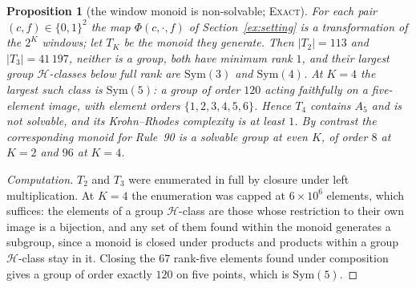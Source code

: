 \documentclass[11pt]{article}
\newtheorem{proposition}[theorem]{Proposition}
\theoremstyle{definition}
\theoremstyle{remark}
\newcommand{\EXACT}{\textsc{Exact}}
\begin{document}
\begin{proposition}[the window monoid is non-solvable; \EXACT]\label{p3:monoid}
For each pair $(c,f)\in\{0,1\}^2$ the map $\Phi(c,\cdot,f)$ of Section~\ref{ex:setting} is a
transformation of the $2^{K}$ windows; let $T_K$ be the monoid they generate. Then $|T_2|=113$ and
$|T_3|=41\,197$, neither is a group, both have minimum rank $1$, and their largest group
$\mathcal H$-classes below full rank are $\mathrm{Sym}(3)$ and $\mathrm{Sym}(4)$. At $K=4$ the largest
such class is $\mathrm{Sym}(5)$: a group of order $120$ acting faithfully on a five-element image, with
element orders $\{1,2,3,4,5,6\}$. Hence $T_4$ contains $A_5$ and is \emph{not solvable}, and its
Krohn--Rhodes complexity is at least $1$. By contrast the corresponding monoid for Rule~90 is a solvable
\emph{group} at even $K$, of order $8$ at $K=2$ and $96$ at $K=4$.
\end{proposition}
\begin{proof}[Computation]
$T_2$ and $T_3$ were enumerated in full by closure under left multiplication. At $K=4$ the enumeration
was capped at $6\times10^{6}$ elements, which suffices: the elements of a group $\mathcal H$-class are
those whose restriction to their own image is a bijection, and any set of them found within the monoid
generates a subgroup, since a monoid is closed under products and products within a group
$\mathcal H$-class stay in it. Closing the $67$ rank-five elements found under composition gives a group
of order exactly $120$ on five points, which is $\mathrm{Sym}(5)$.
\end{proof}
\end{document}
